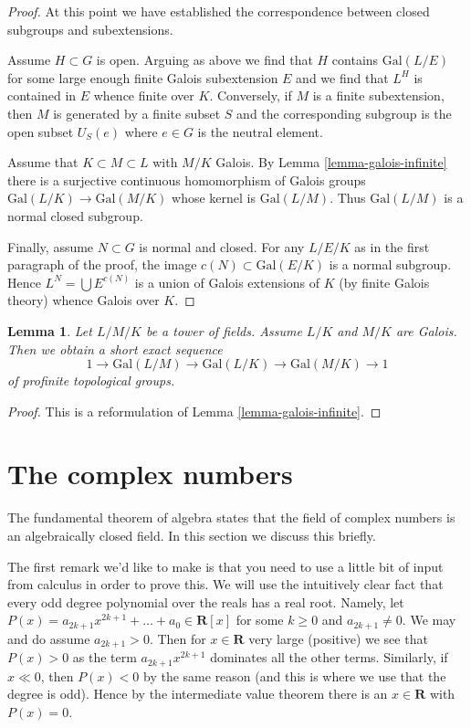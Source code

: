 \documentclass{stacks-project}
\theoremstyle{plain}
\newtheorem{lemma}[subsection]{Lemma}
\theoremstyle{definition}
\theoremstyle{remark}
\numberwithin{equation}{subsection}
\begin{document}
\begin{proof}
\medskip\noindent
At this point we have established the correspondence between closed
subgroups and subextensions.

\medskip\noindent
Assume $H \subset G$ is open. Arguing as above we find that
$H$ contains $\text{Gal}(L/E)$ for some large enough finite
Galois subextension $E$ and we find that $L^H$ is contained
in $E$ whence finite over $K$. Conversely, if $M$ is a finite
subextension, then $M$ is generated by a finite subset $S$
and the corresponding subgroup is the open subset $U_S(e)$
where $e \in G$ is the neutral element.

\medskip\noindent
Assume that $K \subset M \subset L$ with $M/K$ Galois.
By Lemma \ref{lemma-galois-infinite} there is a surjective
continuous homomorphism of Galois groups
$\text{Gal}(L/K) \to \text{Gal}(M/K)$ whose
kernel is $\text{Gal}(L/M)$. Thus $\text{Gal}(L/M)$ is a normal
closed subgroup.

\medskip\noindent
Finally, assume $N \subset G$ is normal and closed. For any
$L/E/K$ as in the first paragraph of the proof, the image
$c(N) \subset \text{Gal}(E/K)$ is a normal subgroup.
Hence $L^N = \bigcup E^{c(N)}$ is a union of Galois extensions
of $K$ (by finite Galois theory) whence Galois over $K$.
\end{proof}

\begin{lemma}
\label{lemma-ses-infinite-galois}
Let $L/M/K$ be a tower of fields. Assume $L/K$ and $M/K$ are Galois.
Then we obtain a short exact sequence
$$
1 \to \text{Gal}(L/M) \to \text{Gal}(L/K) \to \text{Gal}(M/K) \to 1
$$
of profinite topological groups.
\end{lemma}

\begin{proof}
This is a reformulation of Lemma \ref{lemma-galois-infinite}.
\end{proof}






\section{The complex numbers}
\label{section-complex-numbers}

\noindent
The fundamental theorem of algebra states that the field of complex numbers
is an algebraically closed field. In this section we discuss this
briefly.

\medskip\noindent
The first remark we'd like to make is that you need to use a little
bit of input from calculus in order to prove this. We will use the
intuitively clear fact that every odd degree polynomial over
the reals has a real root. Namely, let
$P(x) = a_{2k + 1} x^{2k + 1} + \ldots + a_0 \in \mathbf{R}[x]$
for some $k \geq 0$ and $a_{2k + 1} \not = 0$.
We may and do assume $a_{2k + 1} > 0$. Then for $x \in \mathbf{R}$
very large (positive) we see that $P(x) > 0$ as the term
$a_{2k + 1} x^{2k + 1}$ dominates all the other terms. Similarly,
if $x \ll 0$, then $P(x) < 0$ by the same reason (and this is where
we use that the degree is odd). Hence by the intermediate value
theorem there is an $x \in \mathbf{R}$ with $P(x) = 0$.
\end{document}
